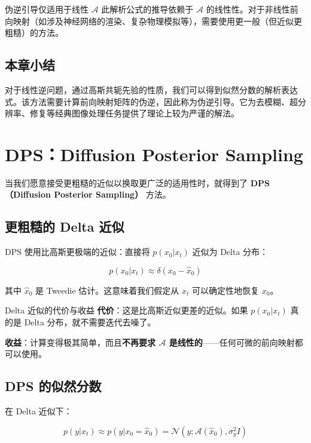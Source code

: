 \documentclass[a4paper]{article}
\begin{document}
\begin{warningbox}{伪逆引导仅适用于线性 $\mathcal{A}$}
此解析公式的推导依赖于 $\mathcal{A}$ 的线性性。对于非线性前向映射（如涉及神经网络的渲染、复杂物理模拟等），需要使用更一般（但近似更粗糙）的方法。
\end{warningbox}

\subsection{本章小结}

对于线性逆问题，通过高斯共轭先验的性质，我们可以得到似然分数的解析表达式。该方法需要计算前向映射矩阵的伪逆，因此称为伪逆引导。它为去模糊、超分辨率、修复等经典图像处理任务提供了理论上较为严谨的解法。


\section{DPS：Diffusion Posterior Sampling}

当我们愿意接受更粗糙的近似以换取更广泛的适用性时，就得到了 \textbf{DPS（Diffusion Posterior Sampling）} 方法。

\subsection{更粗糙的 Delta 近似}

DPS 使用比高斯更极端的近似：直接将 $p(x_0 | x_t)$ 近似为 Delta 分布：

$$
p(x_0 | x_t) \approx \delta(x_0 - \hat{x}_0)
$$

其中 $\hat{x}_0$ 是 Tweedie 估计。这意味着我们假定从 $x_t$ 可以确定性地恢复 $x_0$。

\begin{warningbox}{Delta 近似的代价与收益}
\textbf{代价}：这是比高斯近似更差的近似。如果 $p(x_0|x_t)$ 真的是 Delta 分布，就不需要迭代去噪了。

\textbf{收益}：计算变得极其简单，而且\textbf{不再要求 $\mathcal{A}$ 是线性的}——任何可微的前向映射都可以使用。
\end{warningbox}

\subsection{DPS 的似然分数}

在 Delta 近似下：

$$
p(y | x_t) \approx p(y | x_0 = \hat{x}_0) = \mathcal{N}(y; \mathcal{A}(\hat{x}_0), \sigma_y^2 I)
$$
\end{document}

